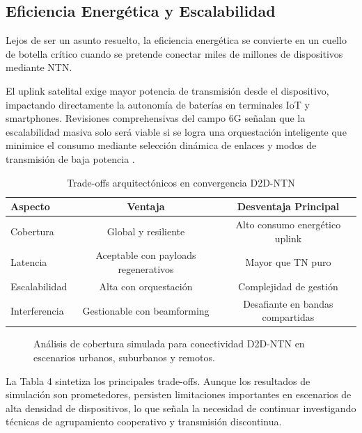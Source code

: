\subsection{Eficiencia Energética y Escalabilidad}

Lejos de ser un asunto resuelto, la eficiencia energética se convierte en un cuello de botella crítico cuando se pretende conectar miles de millones de dispositivos mediante NTN. 

El uplink satelital exige mayor potencia de transmisión desde el dispositivo, impactando directamente la autonomía de baterías en terminales IoT y smartphones. Revisiones comprehensivas del campo 6G señalan que la escalabilidad masiva solo será viable si se logra una orquestación inteligente que minimice el consumo mediante selección dinámica de enlaces y modos de transmisión de baja potencia \cite{Wang2025_NTN6G}.

\begin{table}[t]
\centering
\caption{Trade-offs arquitectónicos en convergencia D2D-NTN}
\label{tab:tradeoffs}
\begin{tabular}{lcc}
\hline
Aspecto & Ventaja & Desventaja Principal \\
\hline
Cobertura & Global y resiliente & Alto consumo energético uplink \\
Latencia & Aceptable con payloads regenerativos & Mayor que TN puro \\
Escalabilidad & Alta con orquestación & Complejidad de gestión \\
Interferencia & Gestionable con beamforming & Desafiante en bandas compartidas \\
\hline
\end{tabular}
\end{table}

\begin{figure}[t]
\centering
\scalebox{0.5}{}
\caption{Análisis de cobertura simulada para conectividad D2D-NTN en escenarios urbanos, suburbanos y remotos.}
\label{fig:coverage_analysis}
\end{figure}

La Tabla 4 sintetiza los principales trade-offs. Aunque los resultados de simulación son prometedores, persisten limitaciones importantes en escenarios de alta densidad de dispositivos, lo que señala la necesidad de continuar investigando técnicas de agrupamiento cooperativo y transmisión discontinua.